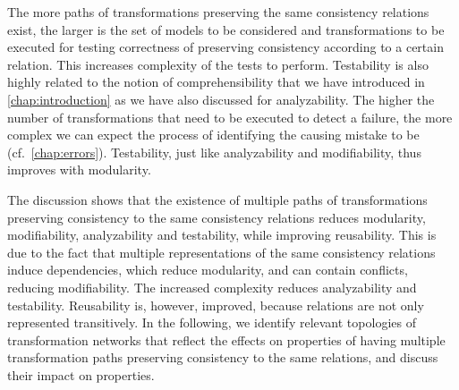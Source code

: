 \begin{properdescription}
    The more paths of transformations preserving the same consistency relations exist, the larger is the set of models to be considered and transformations to be executed for testing correctness of preserving consistency according to a certain relation.
    This increases complexity of the tests to perform.
    Testability is also highly related to the notion of comprehensibility that we have introduced in \autoref{chap:introduction} as we have also discussed for analyzability. 
    The higher the number of transformations that need to be executed to detect a failure, the more complex we can expect the process of identifying the causing mistake to be (cf.\ \autoref{chap:errors}).
    Testability, just like analyzability and modifiability, thus improves with modularity.
\end{properdescription}

The discussion shows that the existence of multiple paths of transformations preserving consistency to the same consistency relations reduces modularity, modifiability, analyzability and testability, while improving reusability.
This is due to the fact that multiple representations of the same consistency relations induce dependencies, which reduce modularity, and can contain conflicts, reducing modifiability.
The increased complexity reduces analyzability and testability.
Reusability is, however, improved, because relations are not only represented transitively.
In the following, we identify relevant topologies of transformation networks that reflect the effects on properties of having multiple transformation paths preserving consistency to the same relations, and discuss their impact on properties.





